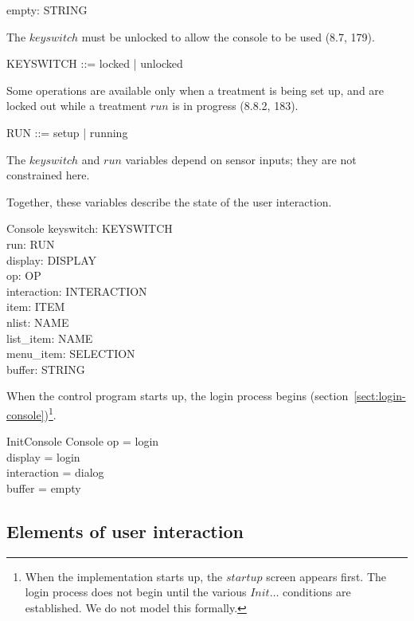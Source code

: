 \documentclass{article}
\begin{document}
\begin{zed}
	[STRING]
\end{zed}

\begin{axdef}
	empty: STRING
\end{axdef}
The $keyswitch$ must be unlocked to allow the console to be used (8.7, 179).

\begin{zed}
	KEYSWITCH ::= locked | unlocked
\end{zed}
Some operations are available only when a treatment is being set up,
and are locked out while a treatment $run$ is in progress (8.8.2, 183).

\begin{zed}
	RUN ::= setup | running
\end{zed}
The $keyswitch$ and $run$ variables depend on sensor inputs; they are not
constrained here.

Together, these variables describe the state of the user interaction.

\begin{schema}{Console}
	keyswitch: KEYSWITCH \\
	run: RUN \\
	display: DISPLAY \\
	op: OP \\
	interaction: INTERACTION \\
	item: ITEM \\
	nlist: \power NAME \\
	list\_item: NAME \\
	menu\_item: SELECTION \\
	buffer: STRING
\end{schema}
When the control program starts up, the login process begins
(section~\ref{sect:login-console})\footnote{When the implementation
starts up, the $startup$ screen appears first.  The login process does
not begin until the various $Init\dots$ conditions are established.
We do not model this formally.}.

\begin{schema}{InitConsole}
	Console
\where
	op = login \\
	display = login \\
	interaction = dialog \\
	buffer = empty
\end{schema}

\subsection{Elements of user interaction} \label{sect:gui-elts}
\end{document}
